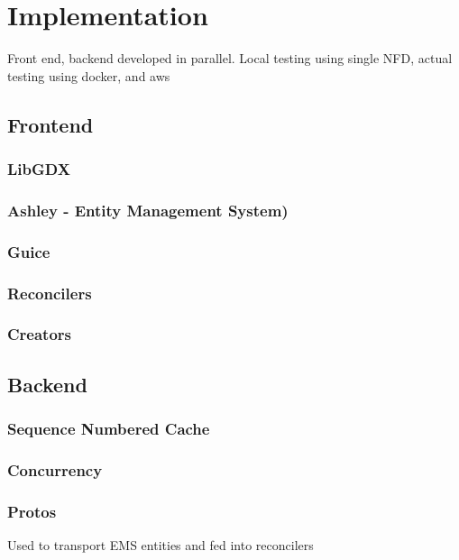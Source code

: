 \chapter{Implementation}
Front end, backend developed in parallel. Local testing using single NFD, actual testing using docker, and aws

\section{Frontend}


\subsection{LibGDX}


\subsection{Ashley - Entity Management System)}


\subsection{Guice}


\subsection{Reconcilers}


\subsection{Creators}




\section{Backend}


\subsection{Sequence Numbered Cache}


\subsection{Concurrency}


\subsection{Protos}
Used to transport EMS entities and fed into reconcilers

